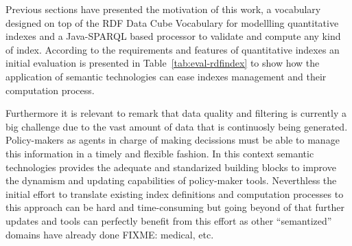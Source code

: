 Previous sections have presented the motivation of this work, a vocabulary designed on top of the 
RDF Data Cube Vocabulary for modellling quantitative indexes and a Java-SPARQL based processor 
to validate and compute any kind of index. According to the requirements and features 
of quantitative indexes an initial evaluation is presented in Table~\ref{tab:eval-rdfindex} to show 
how the application of semantic technologies can ease indexes management and their computation process.

Furthermore it is relevant to remark that data quality and filtering is currently a big challenge 
due to the vast amount of data that is continuosly being generated. Policy-makers as agents in charge 
of making decissions must be able to manage this information in a timely and flexible fashion. In this 
context semantic technologies provides the adequate and standarized building blocks 
to improve the dynamism and updating capabilities of policy-maker tools. Neverthless 
the initial effort to translate existing index definitions and computation processes to this approach can 
be hard and time-consuming but going beyond of that further updates and tools can perfectly benefit from this effort as 
other ``semantized'' domains have already done FIXME: medical, etc.

